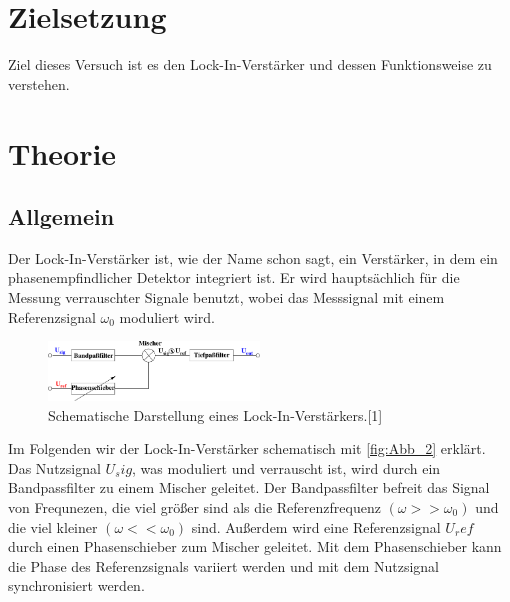 \section{Zielsetzung}
\label{sec:Zielsetzung}
Ziel dieses Versuch ist es den Lock-In-Verstärker und dessen Funktionsweise zu verstehen.

\section{Theorie}
\label{sec:Theorie}
 \subsection{Allgemein} %
 \label{sub:Allgemein}
 Der Lock-In-Verstärker ist, wie der Name schon sagt, ein Verstärker, in dem ein phasenempfindlicher Detektor integriert ist.
 Er wird hauptsächlich für die Messung verrauschter Signale benutzt, wobei das Messsignal mit einem Referenzsignal $\omega_0$ moduliert wird.
 \begin{figure}[H]
    \centering
    \includegraphics[width=0.5\textwidth]{build/Abb_1.pdf}
    \caption {Schematische Darstellung eines Lock-In-Verstärkers.[1]\cite{v303}}
    \label{fig:Abb_1}
\end{figure}
Im Folgenden wir der Lock-In-Verstärker schematisch mit \autoref{fig:Abb_2} erklärt.
Das Nutzsignal $U_sig$, was moduliert und verrauscht ist, wird durch ein Bandpassfilter zu einem Mischer geleitet.
Der Bandpassfilter befreit das Signal von Frequnezen, die viel größer sind als die Referenzfrequenz $(\omega >> \omega_0)$ und die viel kleiner $(\omega << \omega_0)$ sind.
Außerdem wird eine Referenzsignal $U_ref$ durch einen Phasenschieber zum Mischer geleitet.
Mit dem Phasenschieber kann die Phase des Referenzsignals variiert werden und mit dem Nutzsignal synchronisiert werden.
 
